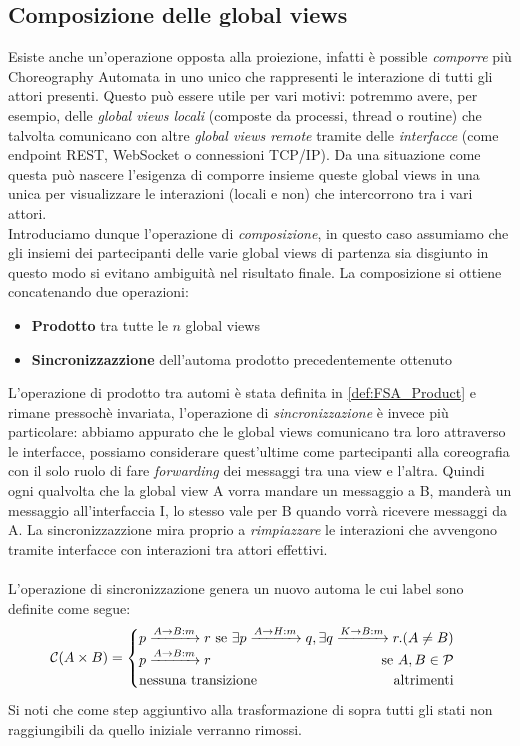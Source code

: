 \subsection{Composizione delle global views}
Esiste anche un'operazione opposta alla proiezione, infatti è possible \emph{comporre} più Choreography Automata in uno unico che rappresenti le interazione di tutti gli attori presenti. Questo può essere utile per vari motivi: potremmo avere, per esempio, delle \emph{global views locali} (composte da processi, thread o routine) che talvolta comunicano con altre \emph{global views remote} tramite delle \emph{interfacce} (come endpoint REST, WebSocket o connessioni TCP/IP). Da una situazione come questa può nascere l'esigenza di comporre insieme queste global views in una unica per visualizzare le interazioni (locali e non) che intercorrono tra i vari attori.\\
Introduciamo dunque l'operazione di \emph{composizione}, in questo caso assumiamo che gli insiemi dei partecipanti delle varie global views di partenza sia disgiunto in questo modo si evitano ambiguità nel risultato finale. La composizione si ottiene concatenando due operazioni:
\begin{itemize}
    \item \textbf{Prodotto} tra tutte le $n$ global views
    \item \textbf{Sincronizzazzione} dell'automa prodotto precedentemente ottenuto
\end{itemize}
L'operazione di prodotto tra automi è stata definita in \ref{def:FSA_Product} e rimane pressochè invariata, l'operazione di \emph{sincronizzazione} è invece più particolare: abbiamo appurato che le global views comunicano tra loro attraverso le interfacce, possiamo considerare quest'ultime come partecipanti alla coreografia con il solo ruolo di fare \emph{forwarding} dei messaggi tra una view e l'altra. Quindi ogni qualvolta che la global view A vorra mandare un messaggio a B, manderà un messaggio all'interfaccia I, lo stesso vale per B quando vorrà ricevere messaggi da A. La sincronizzazzione mira proprio a \emph{rimpiazzare} le interazioni che avvengono tramite interfacce con interazioni tra attori effettivi.\\\\
L'operazione di sincronizzazione genera un nuovo automa le cui label sono definite come segue:
\begin{equation*}
    \mathcal{C}(A \times B) =
    \begin{cases}
        p \xrightarrow{A \rightarrow B: m} r \hfill \text{ se } \exists p \xrightarrow{A \rightarrow H: m} q, \exists  q \xrightarrow{K \rightarrow B: m} r. (A \neq B) \\
        p \xrightarrow{A \rightarrow B: m} r \hfill \text{ se } A, B\in \mathcal{P}                                                                                     \\
        \text{nessuna transizione} \hfill \text{altrimenti}
    \end{cases}
\end{equation*}
Si noti che come step aggiuntivo alla trasformazione di sopra tutti gli stati non raggiungibili da quello iniziale verranno rimossi.

